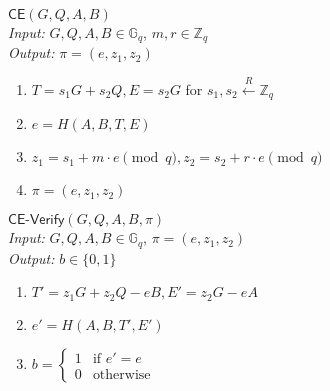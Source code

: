 \documentclass[letterpaper,twocolumn,10pt]{article}
\theoremstyle{definition}
\theoremstyle{remark}
\begin{document}
\noindent\underline{$\mathsf{CE}(G, Q, A, B)$}\\
\textit{Input:} $G, Q, A, B \in \mathbb{G}_q$, $m, r \in \mathbb{Z}_q$\\
\textit{Output:} $\pi = (e, z_1, z_2)$
\begin{enumerate}
\item $T = s_1 G + s_2 Q, E = s_2 G$ for $s_1, s_2 \xleftarrow{R} \mathbb{Z}_q$
\item $e = H(A, B, T, E)$
\item $z_1 = s_1 + m \cdot e \pmod q, z_2 = s_2 + r \cdot e \pmod q$
\item $\pi = (e, z_1, z_2)$
\end{enumerate}

\noindent\underline{$\mathsf{CE}\text{-}\mathsf{Verify}(G, Q, A, B, \pi)$}\\
\textit{Input:} $G, Q, A, B \in \mathbb{G}_q$, $\pi = (e, z_1, z_2)$\\
\textit{Output:} $b \in \{0, 1\}$
\begin{enumerate}
\item $T' = z_1 G + z_2 Q - e B, E' = z_2 G - e A$
\item $e' = H(A, B, T', E')$
\item $b = \begin{cases}
1 & \text{if $e' = e$}\\
0 & \text{otherwise}
\end{cases}$
\end{enumerate}
\end{document}
